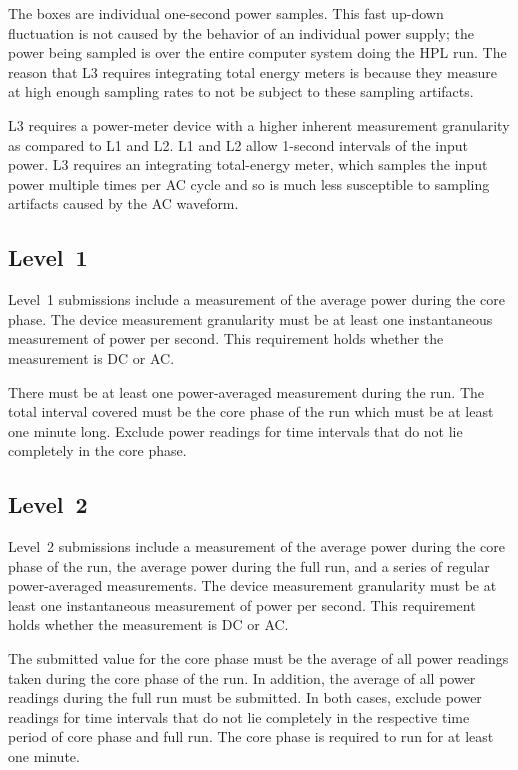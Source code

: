 The boxes are individual one-second power samples.
This fast up-down fluctuation is not caused by the behavior of an individual power supply; the power being sampled is over the entire computer system doing the HPL run.
The reason that L3 requires integrating total energy meters is because they measure at high enough sampling rates to not be subject to these sampling artifacts.

L3 requires a power-meter device with a higher inherent measurement granularity as compared to L1 and L2.
L1 and L2 allow 1-second intervals of the input power.
L3 requires an integrating total-energy meter, which samples the input power multiple times per AC cycle and so is much less susceptible to sampling artifacts caused by the AC waveform.

\subsection{Level~1}

Level~1 submissions include a measurement of the average power during the core phase.
The device measurement granularity must be at least one instantaneous measurement of power per second.
This requirement holds whether the measurement is DC or AC.

There must be at least one power-averaged measurement during the run.
The total interval covered must be the core phase of the run which must be at least one minute long.
Exclude power readings for time intervals that do not lie completely in the core phase.

\subsection{Level~2}

Level~2 submissions include a measurement of the average power during the core phase of the run, the average power during the full run, and a series of regular power-averaged measurements.
The device measurement granularity must be at least one instantaneous measurement of power per second.
This requirement holds whether the measurement is DC or AC.

The submitted value for the core phase must be the average of all power readings taken during the core phase of the run.
In addition, the average of all power readings during the full run must be submitted.
In both cases, exclude power readings for time intervals that do not lie completely in the respective time period of core phase and full run.
The core phase is required to run for at least one minute.

